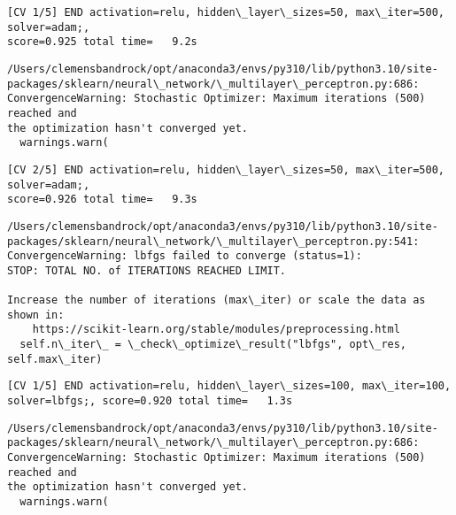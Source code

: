\documentclass[11pt]{article}
\begin{document}
    \begin{Verbatim}[commandchars=\\\{\}]
[CV 1/5] END activation=relu, hidden\_layer\_sizes=50, max\_iter=500, solver=adam;,
score=0.925 total time=   9.2s
    \end{Verbatim}

    \begin{Verbatim}[commandchars=\\\{\}]
/Users/clemensbandrock/opt/anaconda3/envs/py310/lib/python3.10/site-
packages/sklearn/neural\_network/\_multilayer\_perceptron.py:686:
ConvergenceWarning: Stochastic Optimizer: Maximum iterations (500) reached and
the optimization hasn't converged yet.
  warnings.warn(
    \end{Verbatim}

    \begin{Verbatim}[commandchars=\\\{\}]
[CV 2/5] END activation=relu, hidden\_layer\_sizes=50, max\_iter=500, solver=adam;,
score=0.926 total time=   9.3s
    \end{Verbatim}

    \begin{Verbatim}[commandchars=\\\{\}]
/Users/clemensbandrock/opt/anaconda3/envs/py310/lib/python3.10/site-
packages/sklearn/neural\_network/\_multilayer\_perceptron.py:541:
ConvergenceWarning: lbfgs failed to converge (status=1):
STOP: TOTAL NO. of ITERATIONS REACHED LIMIT.

Increase the number of iterations (max\_iter) or scale the data as shown in:
    https://scikit-learn.org/stable/modules/preprocessing.html
  self.n\_iter\_ = \_check\_optimize\_result("lbfgs", opt\_res, self.max\_iter)
    \end{Verbatim}

    \begin{Verbatim}[commandchars=\\\{\}]
[CV 1/5] END activation=relu, hidden\_layer\_sizes=100, max\_iter=100,
solver=lbfgs;, score=0.920 total time=   1.3s
    \end{Verbatim}

    \begin{Verbatim}[commandchars=\\\{\}]
/Users/clemensbandrock/opt/anaconda3/envs/py310/lib/python3.10/site-
packages/sklearn/neural\_network/\_multilayer\_perceptron.py:686:
ConvergenceWarning: Stochastic Optimizer: Maximum iterations (500) reached and
the optimization hasn't converged yet.
  warnings.warn(
    \end{Verbatim}
\end{document}
